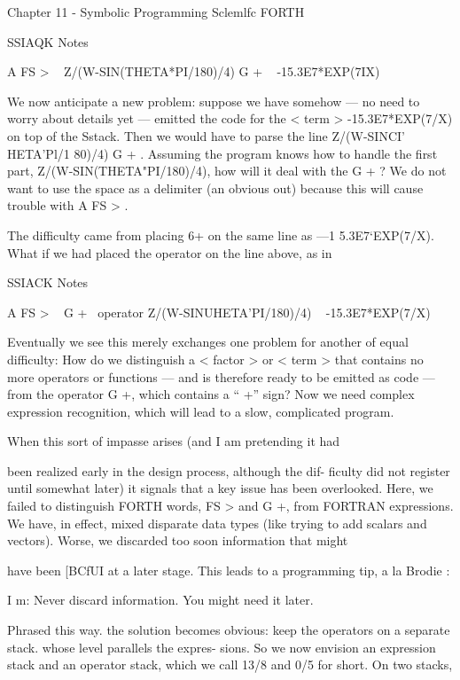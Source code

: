 Chapter 11 - Symbolic Programming Sclemlfc FORTH

 

SSIAQK Notes

A FS > \ < subject >
Z/(W-SIN(THETA*PI/180)/4) G + \ <term >
-15.3E7*EXP(7IX) \ < term >

We now anticipate a new problem: suppose we have somehow —
no need to worry about details yet — emitted the code for the
< term > -15.3E7*EXP(7/X) on top of the Sstack. Then we
would have to parse the line Z/(W-SINCI’ HETA'Pl/1 80)/4) G + .
Assuming the program knows how to handle the first part,
Z/(W-SIN(THETA"PI/180)/4), how will it deal with the G + ?
We do not want to use the space as a delimiter (an obvious out)
because this will cause trouble with A FS > .

The difficulty came from placing 6+ on the same line as
—1 5.3E7‘EXP(7/X). What if we had placed the operator on the
line above, as in

 

SSIACK Notes

A FS > \ < subject >
G + \ operator
Z/(W-SINUHETA'PI/180)/4) \ < term >
-15.3E7*EXP(7/X) \ < term >

Eventually we see this merely exchanges one problem for another
of equal difficulty: How do we distinguish a < factor > or
< term > that contains no more operators or functions — and is
therefore ready to be emitted as code — from the operator G +,
which contains a “ +” sign? Now we need complex expression
recognition, which will lead to a slow, complicated program.

When this sort of impasse arises (and I am pretending it had

been realized early in the design process, although the dif-
ficulty did not register until somewhat later) it signals that a key
issue has been overlooked. Here, we failed to distinguish FORTH
words, FS > and G +, from FORTRAN expressions. We have, in
effect, mixed disparate data types (like trying to add scalars and
vectors). Worse, we discarded too soon information that might

have been [BCfUI at a later stage. This leads to a programming tip,
a la Brodie :

I m: Never discard information. You might need it later.

Phrased this way. the solution becomes obvious: keep the
operators on a separate stack. whose level parallels the expres-
sions. So we now envision an expression stack and an operator
stack, which we call 13/8 and 0/5 for short. On two stacks,

